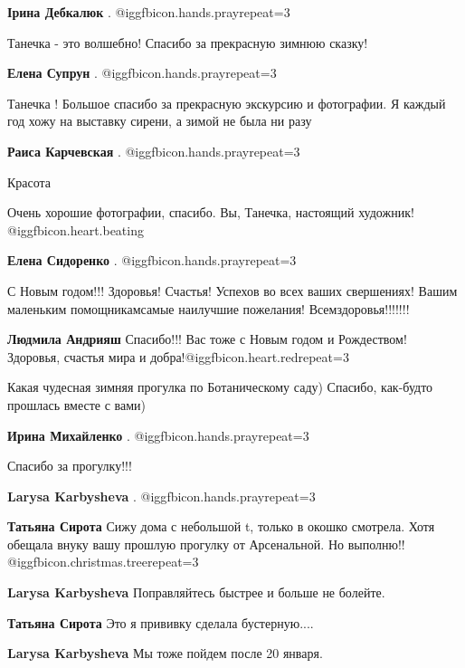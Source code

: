 \begin{itemize}
\textbf{Ірина Дебкалюк} . @igg{fbicon.hands.pray}{repeat=3} 

Танечка - это волшебно! Спасибо за прекрасную зимнюю сказку!

\textbf{Елена Супрун} . @igg{fbicon.hands.pray}{repeat=3} 

Танечка !
Большое спасибо за прекрасную экскурсию и фотографии. Я каждый год хожу на
выставку сирени, а зимой не была ни разу

\textbf{Раиса Карчевская} . @igg{fbicon.hands.pray}{repeat=3} 

Красота


Очень хорошие фотографии, спасибо. Вы, Танечка, настоящий художник! @igg{fbicon.heart.beating} 

\textbf{Елена Сидоренко} . @igg{fbicon.hands.pray}{repeat=3} 


С Новым годом!!! Здоровья! Счастья! Успехов во всех ваших свершениях! Вашим
маленьким помощникамсамые наилучшие пожелания! Всемздоровья!!!!!!!


\textbf{Людмила Андрияш} Спасибо!!!
Вас тоже с Новым годом и Рождеством!
Здоровья, счастья мира и добра!@igg{fbicon.heart.red}{repeat=3}

Какая чудесная зимняя прогулка по Ботаническому саду) Спасибо, как-будто прошлась вместе с вами)

\textbf{Ирина Михайленко} . @igg{fbicon.hands.pray}{repeat=3} 

Спасибо за прогулку!!!

\begin{itemize} %
\textbf{Larysa Karbysheva} . @igg{fbicon.hands.pray}{repeat=3} 

\textbf{Татьяна Сирота} Сижу дома с небольшой t, только в окошко смотрела. Хотя обещала внуку вашу прошлую прогулку от Арсенальной. Но выполню!! @igg{fbicon.christmas.tree}{repeat=3} 

\textbf{Larysa Karbysheva} Поправляйтесь быстрее и больше не болейте.

\textbf{Татьяна Сирота} Это я прививку сделала бустерную....

\textbf{Larysa Karbysheva} Мы тоже пойдем после 20 января.


\end{itemize}
\end{itemize}
